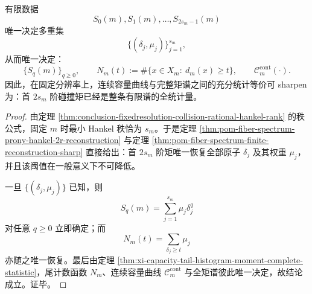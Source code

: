 \begin{corollary}\label{cor:conclusion-fixedresolution-first-2sm-sufficiency}
有限数据
\[
S_0(m),S_1(m),\dots,S_{2s_m-1}(m)
\]
唯一决定多重集
\[
\{(\delta_j,\mu_j)\}_{j=1}^{s_m},
\]
从而唯一决定：
\[
\{S_q(m)\}_{q\ge 0},
\qquad
N_m(t):=\#\{x\in X_m:\ d_m(x)\ge t\},
\qquad
\mathcal C_m^{\mathrm{cont}}(\cdot).
\]
因此，在固定分辨率上，连续容量曲线与完整矩谱之间的充分统计等价可 sharpen 为：首 \(2s_m\) 阶碰撞矩已经是整条有限谱的全统计量。
\end{corollary}
\begin{proof}
由定理 \ref{thm:conclusion-fixedresolution-collision-rational-hankel-rank} 的秩公式，固定 \(m\) 时最小 Hankel 秩恰为 \(s_m\)。于是定理 \ref{thm:pom-fiber-spectrum-prony-hankel-2r-reconstruction} 与定理 \ref{thm:pom-fiber-spectrum-finite-reconstruction-sharp} 直接给出：首 \(2s_m\) 阶矩唯一恢复全部原子 \(\delta_j\) 及其权重 \(\mu_j\)，并且该阈值在一般意义下不可降低。

一旦 \(\{(\delta_j,\mu_j)\}\) 已知，则
\[
S_q(m)=\sum_{j=1}^{s_m}\mu_j\delta_j^q
\]
对任意 \(q\ge 0\) 立即确定；而
\[
N_m(t)=\sum_{\delta_j\ge t}\mu_j
\]
亦随之唯一恢复。最后由定理 \ref{thm:xi-capacity-tail-histogram-moment-complete-statistic}，尾计数函数 \(N_m\)、连续容量曲线 \(\mathcal C_m^{\mathrm{cont}}\) 与全矩谱彼此唯一决定，故结论成立。证毕。
\end{proof}

